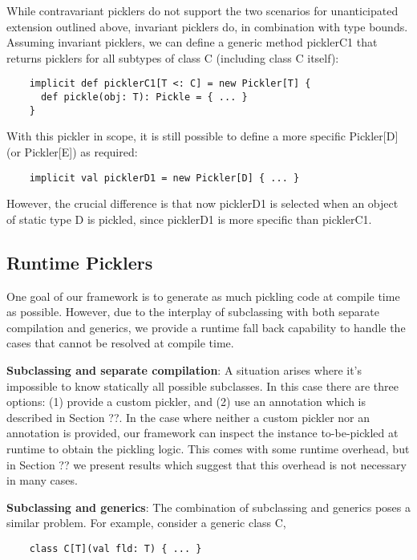 \documentclass[preprint,10pt]{sigplanconf}
\begin{document}
While contravariant picklers do not support the two scenarios for unanticipated extension outlined above, invariant picklers do, in combination with type bounds. Assuming invariant picklers, we can define a generic method picklerC1 that returns picklers for all subtypes of class C (including class C itself):

\begin{verbatim}
    implicit def picklerC1[T <: C] = new Pickler[T] {
      def pickle(obj: T): Pickle = { ... }
    }
\end{verbatim}

With this pickler in scope, it is still possible to define a more specific Pickler[D] (or Pickler[E]) as required:

\begin{verbatim}
    implicit val picklerD1 = new Pickler[D] { ... }
\end{verbatim}

However, the crucial difference is that now picklerD1 is selected when an object of static type D is pickled, since picklerD1 is more specific than picklerC1.

\subsection{Runtime Picklers}

One goal of our framework is to generate as much pickling code at compile time as possible. However, due to the interplay of subclassing with both separate compilation and generics, we provide a runtime fall back capability to handle the cases that cannot be resolved at compile time.

{\bf Subclassing and separate compilation}: A situation arises where it's impossible to know statically all possible subclasses. In this case there are three options: (1) provide a custom pickler, and (2) use an annotation which is described in Section ??. In the case where neither a custom pickler nor an annotation is provided, our framework can inspect the instance to-be-pickled at runtime to obtain the pickling logic. This comes with some runtime overhead, but in Section ?? we present results which suggest that this overhead is not necessary in many cases.

{\bf Subclassing and generics}: The combination of subclassing and generics poses a similar problem. For example, consider a generic class C,

\begin{verbatim}
    class C[T](val fld: T) { ... }
\end{verbatim}
\end{document}
